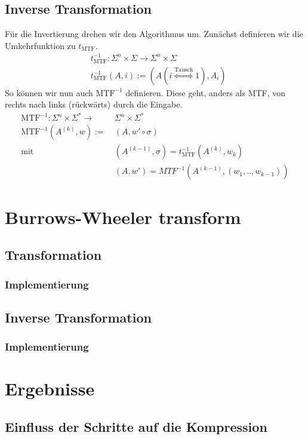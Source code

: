\documentclass{article}
\begin{document}
\subsection{Inverse Transformation}
Für die Invertierung drehen wir den Algorithmus um. Zunächst definieren wir die Umkehrfunktion zu $t_{\text{MTF}}$.
\begin{equation}
\begin{split}
    &t^{-1}_{\text{MTF}}:\Sigma^n\times\Sigma\rightarrow\Sigma^n\times\Sigma\\
    &t^{-1}_{\text{MTF}}(A,i):=(A(i\stackrel{\text{Tausch}}{\Leftrightarrow}1),A_i)
\end{split}
\end{equation}
So können wir nun auch $\text{MTF}^{-1}$ definieren. Diese geht, anders als MTF, von rechts nach links (rückwärts) durch die Eingabe.
\begin{equation}
\begin{split}
    \text{MTF}^{-1}:\Sigma^n\times\Sigma^*\rightarrow~&\Sigma^n\times\Sigma^*\\
    \text{MTF}^{-1}(A^{(k)},w):=~&(A,w'\circ\sigma)\\
    \text{mit}~&(A^{(k-1)},\sigma)=t^{-1}_{\text{MTF}}(A^{(k)},w_k)\\
    &(A,w')=MTF^{-1}(A^{(k-1)},(w_1,..,w_{k-1}))
\end{split}
\end{equation}
\newpage
\section{Burrows-Wheeler transform}
\subsection{Transformation}
\subsubsection{Implementierung}
\subsection{Inverse Transformation}
\subsubsection{Implementierung}
\newpage
\section{Ergebnisse}
\subsection{Einfluss der Schritte auf die Kompression}
\printbibliography[heading=bibintoc]
\end{document}
